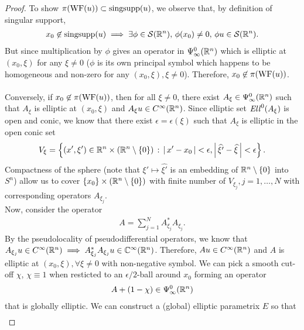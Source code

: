 \documentclass[12pt]{article}
\begin{document}
\begin{proof}
    To show $\pi(\mathrm{WF}(u)) \subset \mathrm{singsupp}(u)$, we observe that, by definition of singular support, 
    \begin{align*}
        x_0 \not \in \mathrm{singsupp}(u) \implies \exists \phi \in \mathcal{S}({\mathbb R}^n), \, \phi(x_0) \neq 0, \, \phi u \in \mathcal{S}({\mathbb R}^n). 
    \end{align*}
    But since multiplication by $\phi$ gives an operator in $\Psi^0_\infty({\mathbb R}^n)$ which is elliptic at $(x_0, \xi)$ for any $\xi \neq 0$ ($\phi$ is its own principal symbol which happens to be homogeneous and non-zero for any $(x_0, \xi), \xi \neq 0$). Therefore, $x_0 \not \in \pi(\mathrm{WF}(u))$. \\
    \\
    Conversely, if $x_0 \not\in \pi(\mathrm{WF}(u))$, then for all $\xi \neq 0$, there exist $A_\xi \in \Psi^0_\infty({\mathbb R}^n)$ such that $A_\xi$ is elliptic at $(x_0, \xi)$ and $A_\xi u \in C^\infty({\mathbb R}^n)$. Since elliptic set $\mathit{Ell}^0(A_\xi)$ is open and conic, we know that there exist $\epsilon = \epsilon(\xi)$ such that $A_\xi$ is elliptic in the open conic set
    \begin{align*}
        V_\xi = \left\{(x', \xi')\in {\ensuremath {\mathbb R}}^n \times ({\mathbb R}^n \setminus \left\{0\right\}) \, : \, \left|\, x' - x_0\,\right| < \epsilon, \left|\, \widehat{\xi'} - \widehat{\xi}\,\right| < \epsilon \right\}. 
    \end{align*}
    Compactness of the sphere (note that $\xi' \mapsto \widehat{\xi'}$ is an embedding of ${\mathbb R}^n \setminus \left\{0\right\}$ into $S^n$) allow us to cover $\left\{x_0\right\} \times ({\mathbb R}^n \setminus \left\{0\right\})$ with finite number of $V_{\xi_j}, j = 1, \dots, N$ with corresponding operators $A_{\xi_j}$. \\
    Now, consider the operator
    \begin{align*}
        A = \sum_{j = 1}^N A^*_{\xi_j}A_{\xi_j}. 
    \end{align*}
    By the pseudolocality of pseudodifferential operators, we know that $A_{\xi_j} u \in C^\infty({\mathbb R}^n) \implies A^*_{\xi_j} A_{\xi_j} u \in {\ensuremath {\mathbb C}}^\infty({\mathbb R}^n)$. Therefore, $Au \in C^\infty({\mathbb R}^n)$ and $A$ is elliptic at $(x_0, \xi), \forall \xi \neq 0$ with non-negative symbol. We can pick a smooth cut-off $\chi$, $\chi \equiv 1$ when resticted to an $\epsilon/2$-ball around $x_0$ forming an operator
    \begin{align*}
        A + (1 - \chi) \in \Psi^0_\infty({\mathbb R}^n)
    \end{align*}
    that is globally elliptic. We can construct a (global) elliptic parametrix $E$ so that 
    \begin{align*}

\end{align*}
\end{proof}
\end{document}
